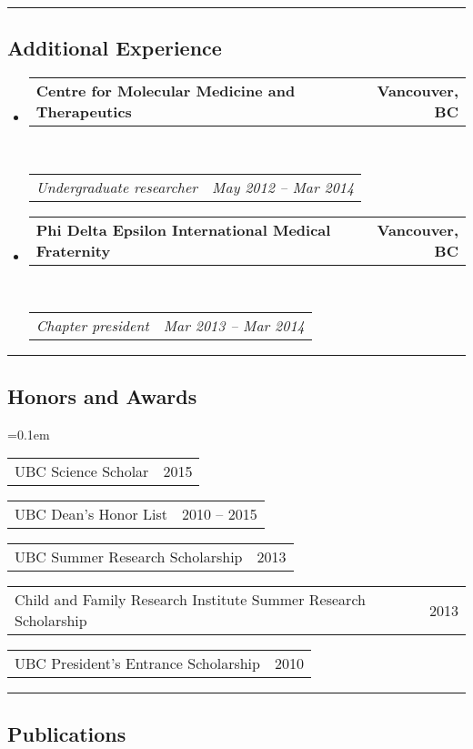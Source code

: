 \documentclass[10pt,letterpaper]{article}
\makeatletter
\newcommand{\headerrow}[2]
{\begin{tabular*}{\linewidth}{l@{\extracolsep{\fill}}r}
	#1 &
	#2 \\
\end{tabular*}}
\makeatother
\begin{document}
\hrule
\vspace{-0.4em}

\subsection*{Additional Experience}

\begin{itemize}
	\parskip=0.1em

	\item 
	\headerrow
		{\textbf{Centre for Molecular Medicine and Therapeutics}}
		{\textbf{Vancouver, BC}}
	\\
	\headerrow
		{\emph{Undergraduate researcher}}
		{\emph{May 2012 -- Mar 2014}}

	\item 
	\headerrow
		{\textbf{Phi Delta Epsilon International Medical Fraternity}}
		{\textbf{Vancouver, BC}}
	\\
	\headerrow
		{\emph{Chapter president}}
		{\emph{Mar 2013 -- Mar 2014}}
\end{itemize}


\hrule
\vspace{-0.4em}

\subsection*{Honors and Awards}

\begin{itemize*}
	\parskip=0.1em
	\item 
	\headerrow
		{{UBC Science Scholar}}
		{{2015}}
	\item 
	\headerrow
		{{UBC Dean's Honor List}}
		{{2010 -- 2015}}
	\item 
	\headerrow
		{{UBC Summer Research Scholarship}}
		{{2013}}
	\item 
	\headerrow
		{{Child and Family Research Institute Summer Research Scholarship}}
		{{2013}}
	\item 
	\headerrow
		{{UBC President's Entrance Scholarship}}
		{{2010}}
\end{itemize*}


\hrule
\vspace{-0.4em}

\subsection*{Publications}
\end{document}
